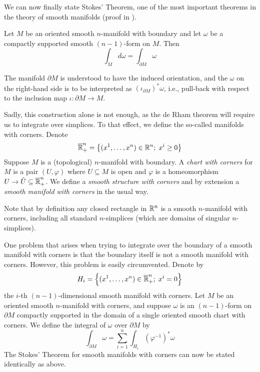 \documentclass[a4paper, 12pt]{article}
\begin{document}
We can now finally state Stokes' Theorem, one of the most important theorems in the theory of smooth manifolds (proof in \cite[Thm. 16.11]{Lee2012}).
\begin{theorem}
    Let $M$ be an oriented smooth $n$-manifold with boundary and let $\omega$ be a compactly supported smooth $(n-1)$-form on $M$.
    Then
    \[
        \int_{M} d\omega = \int_{\partial M} \omega
    \]
\end{theorem}
\begin{remark}
    The manifold $\partial M$ is understood to have the induced orientation,
    and the $\omega$ on the right-hand side is to be interpreted as $(\iota_{\partial M})^*\omega$,
    i.e., pull-back with respect to the inclusion map $\iota \colon \partial M \to M$.
\end{remark}

Sadly, this construction alone is not enough, as the de Rham theorem will require us to integrate over simplices.
To that effect, we define the so-called manifolds with corners.
Denote
\[
    \overline{\mathbb{R}}_+^n = \left\{ (x^1,\dots,x^n) \in \mathbb{R}^n ; \; x^i \geq 0 \right\}
\]
Suppose $M$ is a (topological) $n$-manifold with boundary.
A \emph{chart with corners} for $M$ is a pair $(U, \varphi)$ where $U \subseteq M$ is open and $\varphi$ is a homeomorphism $U \to \hat{U}\subseteq \overline{\mathbb{R}}_+^n$.
We define a \emph{smooth structure with corners} and by extension a \emph{smooth manifold with corners} in the usual way.
\begin{remark}
Note that by definition any closed rectangle in $\mathbb{R}^n$ is a smooth $n$-manifold with corners,
including all standard $n$-simplices (which are domains of singular $n$-simplices).
\end{remark}

One problem that arises when trying to integrate over the boundary of a smooth manifold with corners is that the boundary itself is not a smooth manifold with corners.
However, this problem is easily circumvented.
Denote by
\[
    H_i = \left\{ (x^1,\dots,x^n) \in \overline{\mathbb{R}}_+^n ; \; x^i = 0 \right\}
\]
the $i$-th $(n-1)$-dimensional smooth manifold with corners.
Let $M$ be an oriented smooth $n$-manifold with corners, and suppose $\omega$ is an $(n-1)$-form on $\partial M$ compactly supported in the domain of a single oriented smooth chart with corners.
We define the integral of $\omega$ over $\partial M$ by
\[
    \int_{\partial M} \omega = \sum_{i = 1}^{n}\int_{H_i} \left( \varphi^{-1} \right)^*\omega
\]
The Stokes' Theorem for smooth manifolds with corners can now be stated identically as above.
\end{document}
